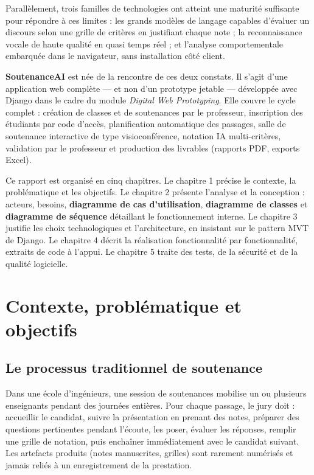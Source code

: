 \documentclass[12pt,a4paper]{report}
\begin{document}
Parallèlement, trois familles de technologies ont atteint une maturité
suffisante pour répondre à ces limites : les grands modèles de langage capables
d'évaluer un discours selon une grille de critères en justifiant chaque note ;
la reconnaissance vocale de haute qualité en quasi temps réel ; et l'analyse
comportementale embarquée dans le navigateur, sans installation côté client.

\textbf{SoutenanceAI} est née de la rencontre de ces deux constats. Il s'agit
d'une application web complète --- et non d'un prototype jetable --- développée
avec Django dans le cadre du module \emph{Digital Web Prototyping}. Elle couvre
le cycle complet : création de classes et de soutenances par le professeur,
inscription des étudiants par code d'accès, planification automatique des
passages, salle de soutenance interactive de type visioconférence, notation IA
multi-critères, validation par le professeur et production des livrables
(rapports PDF, exports Excel).

Ce rapport est organisé en cinq chapitres. Le chapitre 1 précise le contexte,
la problématique et les objectifs. Le chapitre 2 présente l'analyse et la
conception : acteurs, besoins, \textbf{diagramme de cas d'utilisation},
\textbf{diagramme de classes} et \textbf{diagramme de séquence} détaillant le
fonctionnement interne. Le chapitre 3 justifie les choix technologiques et
l'architecture, en insistant sur le pattern MVT de Django. Le chapitre 4 décrit
la réalisation fonctionnalité par fonctionnalité, extraits de code à l'appui.
Le chapitre 5 traite des tests, de la sécurité et de la qualité logicielle.

\chapter{Contexte, problématique et objectifs}

\section{Le processus traditionnel de soutenance}

Dans une école d'ingénieurs, une session de soutenances mobilise un ou
plusieurs enseignants pendant des journées entières. Pour chaque passage, le
jury doit : accueillir le candidat, suivre la présentation en prenant des
notes, préparer des questions pertinentes pendant l'écoute, les poser, évaluer
les réponses, remplir une grille de notation, puis enchaîner immédiatement avec
le candidat suivant. Les artefacts produits (notes manuscrites, grilles) sont
rarement numérisés et jamais reliés à un enregistrement de la prestation.
\end{document}

